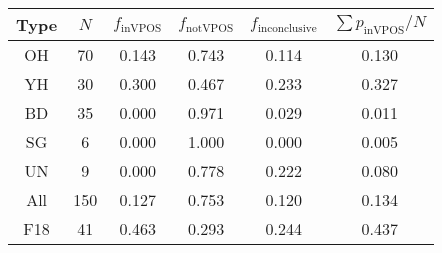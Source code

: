 \begin{tabular}{cccccc}
	\toprule
	Type & $N$ & $f_\text{inVPOS}$ & $f_\text{notVPOS}$ & $f_\text{inconclusive}$ & $\sum p_\text{inVPOS} / N$ \\
	\midrule
	OH & 70 & 0.143 & 0.743 & 0.114 & 0.130 \\
	YH & 30 & 0.300 & 0.467 & 0.233 & 0.327 \\
	BD & 35 & 0.000 & 0.971 & 0.029 & 0.011 \\
	SG & 6 & 0.000 & 1.000 & 0.000 & 0.005 \\
	UN & 9 & 0.000 & 0.778 & 0.222 & 0.080 \\
	\midrule
	All & 150 & 0.127 & 0.753 & 0.120 & 0.134 \\
	\midrule
	F18 & 41 & 0.463 & 0.293 & 0.244 & 0.437 \\
	\bottomrule
\end{tabular}
